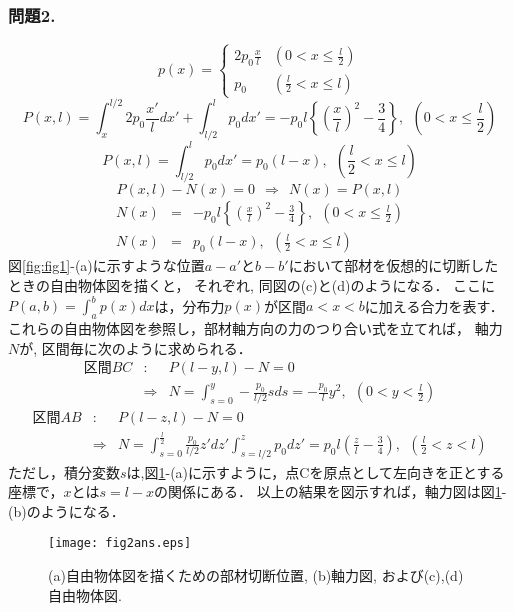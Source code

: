 \documentclass[10pt,a4j]{jarticle}
\begin{document}
\subsubsection*{問題2.}
\begin{equation}
	p(x)=\left\{
		\begin{array}{cc}
			2p_0 \frac{x}{l} & \left(0 < x \leq \frac{l}{2}\right) \\
			p_0  & \left(\frac{l}{2}< x \leq l \right) 
		\end{array}
	\right.
\end{equation}
\begin{equation}
	P(x,l)=
	\int_x^{l/2} 2p_0 \frac{x'}{l}dx'
	+
	\int_{l/2}^l  p_0 dx'
	=
	-p_0l\left\{ \left( \frac{x}{l}\right)^2 -\frac{3}{4}\right\} , \ \ 
	 \left(0 < x \leq \frac{l}{2}\right) 
\end{equation}
\begin{equation}
	P(x,l)=
	\int_{l/2}^l  p_0 dx'=p_0(l-x), \ \  \left(\frac{l}{2}< x \leq l \right) 
\end{equation}
\begin{equation}
	P(x,l)-N(x)=0 \ \ \Rightarrow \ \ N(x)=P(x,l)
\end{equation}
\begin{eqnarray}
	N(x) &= & -p_0l\left\{ \left( \frac{x}{l}\right)^2 -\frac{3}{4}\right\} , 
	\ \ \left(0 < x \leq \frac{l}{2}\right)  \\
	N(x) &= & 
	p_0(l-x), \ \  \left(\frac{l}{2}< x \leq l \right) 
\end{eqnarray}
図\ref{fig:fig1}-(a)に示すような位置$a-a'$と$b-b'$において部材を仮想的に切断したときの自由物体図を描くと，
それぞれ, 同図の(c)と(d)のようになる．
ここに$P(a,b)=\int_a^bp(x)dx$は，分布力$p(x)$が区間$a<x<b$に加える合力を表す．
これらの自由物体図を参照し，部材軸方向の力のつり合い式を立てれば，
軸力$N$が, 区間毎に次のように求められる．
\begin{eqnarray}
	区間BC&:& 
	P(l-y,l)-N = 0  \\ \nonumber
	 &\Rightarrow &
		N = \int_{s=0}^y -\frac{p_0}{l/2}s ds = -\frac{p_0}{l}y^2, \ \ 
		\left(0< y < \frac{l}{2}\right)
\end{eqnarray}
\begin{eqnarray}
	区間AB &:&
	P(l-z,l)-N = 0 \nonumber \\
	&\Rightarrow &
	N=\int_{s=0}^{\frac{l}{2}}\frac{p_0}{l/2}z'dz' 
	  \int_{s=l/2}^{z}p_0dz' 
	=p_0l \left( \frac{z}{l}-\frac{3}{4}\right) , \ \ \left( \frac{l}{2}< z < l \right)
\end{eqnarray}
ただし，積分変数$s$は,図\ref{fig:fig2}-(a)に示すように，点Cを原点として左向きを正とする
座標で，$x$とは$s=l-x$の関係にある．
以上の結果を図示すれば，軸力図は図\ref{fig:fig2}-(b)のようになる．
\begin{figure}[h]
	\vspace{-3mm}
	\begin{center}
	\texttt{[image: fig2ans.eps]} 
	\end{center}
	\vspace{-5mm}
	\caption{(a)自由物体図を描くための部材切断位置, (b)軸力図,
	および(c),(d)自由物体図.} 
	\label{fig:fig2}
\end{figure}
\end{document}
